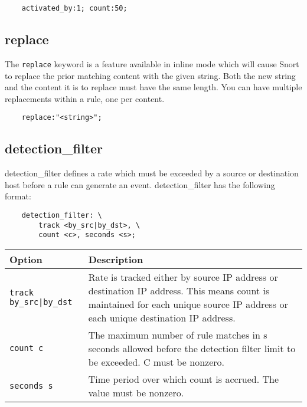 \documentclass[english]{report}
\begin{document}
\begin{verbatim}
    activated_by:1; count:50;
\end{verbatim}

\subsection{replace}
\label{replace}

The \texttt{replace} keyword is a feature available in inline mode which will
cause Snort to replace the prior matching content with the given string.  Both
the new string and the content it is to replace must have the same length.  You
can have multiple replacements within a rule, one per content.

\begin{verbatim}
    replace:"<string>";
\end{verbatim}

\subsection{detection\_filter}
\label{detection_filter}

detection\_filter defines a rate which must be exceeded by a source or
destination host before a rule can generate an event.  detection\_filter has
the following format:

\begin{verbatim}
    detection_filter: \
        track <by_src|by_dst>, \
        count <c>, seconds <s>;
\end{verbatim}

\begin{table}[h]
\begin{center}
\begin{tabular}{| p{1in} | p{4.5in} |}

\hline
Option & Description \\
\hline

\hline
\texttt{track by\_src|by\_dst} &

Rate is tracked either by source IP address or destination IP address.  This
means count is maintained for each unique source IP address or each unique
destination IP address.\\

\hline
\texttt{count c} &

The maximum number of rule matches in s seconds allowed before the detection
filter limit to be exceeded.  C must be nonzero.\\

\hline
\texttt{seconds s} &

Time period over which count is accrued.  The value must be nonzero.\\

\hline
\end{tabular}
\end{center}
\end{table}
\end{document}
